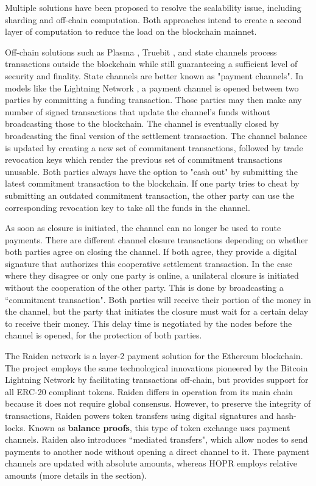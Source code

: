Multiple solutions have been proposed to resolve the scalability issue, including sharding and off-chain computation. Both approaches intend to create a second layer of computation to reduce the load on the blockchain mainnet.

Off-chain solutions such as Plasma \cite{plasma}, Truebit \cite{truebit}, and state channels process transactions outside the blockchain while still guaranteeing a sufficient level of security and finality. State channels are better known as "payment channels". In models like the Lightning Network \cite{lightningnetwork}, a payment channel is opened between two parties by committing a funding transaction. Those parties may then make any number of signed transactions that update the channel's funds without broadcasting those to the blockchain. The channel is eventually closed by broadcasting the final version of the settlement transaction.
The channel balance is updated by creating a new set of commitment transactions, followed by trade revocation keys which render the previous set of commitment transactions unusable. Both parties always have the option to "cash out" by submitting the latest commitment transaction to the blockchain. If one party tries to cheat by submitting an outdated commitment transaction, the other party can use the corresponding revocation key to take all the funds in the channel.

As soon as closure is initiated, the channel can no longer be used to route payments. There are different channel closure transactions depending on whether both parties agree on closing the channel. If both agree, they provide a digital signature that authorizes this cooperative settlement transaction. In the case where they disagree or only one party is online, a unilateral closure is initiated without the cooperation of the other party. This is done by broadcasting a ``commitment transaction". Both parties will receive their portion of the money in the channel, but the party that initiates the closure must wait for a certain delay to receive their money. This delay time is negotiated by the nodes before the channel is opened, for the protection of both parties.

The Raiden network \cite{raiden} is a layer-2 payment solution for the Ethereum blockchain. The project employs the same technological innovations pioneered by the Bitcoin Lightning Network by facilitating transactions off-chain, but provides support for all ERC-20 compliant tokens. Raiden differs in operation from its main chain because it does not require global consensus. However, to preserve the integrity of transactions, Raiden powers token transfers using digital signatures and hash-locks. Known as \textbf{balance proofs}, this type of token exchange uses payment channels. Raiden also introduces ``mediated transfers", which allow nodes to send payments to another node without opening a direct channel to it. These payment channels are updated with absolute amounts, whereas HOPR employs relative amounts (more details in the  section).

